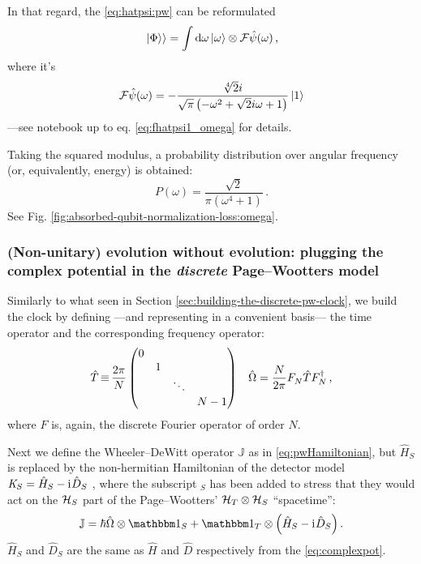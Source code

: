 In that regard, the \eqref{eq:hatpsi:pw} can be reformulated
\begin{equation}
  \left.\left| \Phi \right\rangle\right\rangle = \int \dd{\omega} \ket{\omega} \otimes \mathcal{F} \hat{\psi} (\omega) \,\text{,}
\end{equation}
where it's
\begin{equation}
  \mathcal{F} \hat{\psi} (\omega) = - \frac{\sqrt[4]{2} i}{\sqrt{\pi} \left(- \omega^{2} + \sqrt{2} i \omega + 1\right)} \ket{1}
\end{equation}
---see notebook up to eq. \eqref{eq:fhatpsi1_omega} for details.

Taking the squared modulus, a probability distribution over angular frequency
(or, equivalently, energy) is obtained:
\[
  P(\omega) = \frac{\sqrt{2}}{\pi \left(\omega^{4} + 1\right)}
  \,\text{.}
\]
See Fig. \ref{fig:absorbed-qubit-normalization-loss:omega}.

\citereset
\subsubsection{
  (Non-unitary) evolution without evolution:
  plugging the complex potential in the \emph{discrete} Page--Wootters model
}

Similarly to what seen in Section \ref{sec:building-the-discrete-pw-clock}, we build
the clock by defining ---and representing in a convenient basis---
the time operator and the corresponding frequency operator:
\begin{align}
  \hat{T} \operatorname*{\equiv} \frac{2\pi}{N}
  \begin{pmatrix}
    0           &       &       &       \\
                &1      &       &       \\
                &       &\ddots &       \\
                &       &       &N-1
  \end{pmatrix}
  &&
  \hat{\Omega} = \frac{N}{2\pi} F^{}_{N} \hat{T} F^{\dagger}_{N} \, \text{,}
\end{align}
where $F$ is, again, the discrete Fourier operator of order $N$.

Next we define the Wheeler--DeWitt operator $\mathbb{J}$ as in
\eqref{eq:pwHamiltonian}, but $\hat{H}_S$ is replaced by the non-hermitian
Hamiltonian of the detector model
$\mathit{K}_S = \hat{H}_S - \mathrm{i}\mkern1mu \hat{D}_S$
\parencite{RuschhauptAbsorption},
where the subscript $_S$ has been added to stress
that they would act on the $\mathcal{H}_S$ part
of the Page--Wootters' $\mathcal{H}_T \otimes \mathcal{H}_S$ ``spacetime'':
\begin{equation}
  \mathbb{J} = \hbar\hat{\Omega}\ox\idop_S + \idop_T\ox\qty(\hat{H}_S -\iu \hat{D}_S) \,\text{.}
\end{equation}
$\hat{H}_S$ and $\hat{D}_S$ are the same as $\hat{H}$ and $\hat{D}$
respectively from the \eqref{eq:complexpot}.

